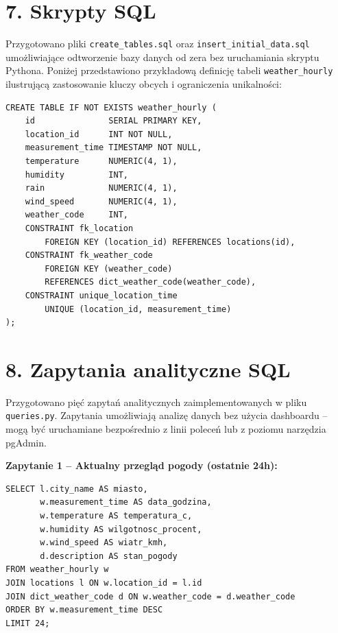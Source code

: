 \documentclass[12pt, a4paper]{article}
\begin{document}
\section*{\textbf{7. Skrypty SQL}}

Przygotowano pliki \texttt{create\_tables.sql} oraz \texttt{insert\_initial\_data.sql}
umożliwiające odtworzenie bazy danych od zera bez uruchamiania skryptu Pythona.
Poniżej przedstawiono przykładową definicję tabeli \texttt{weather\_hourly}
ilustrującą zastosowanie kluczy obcych i ograniczenia unikalności:

\begin{lstlisting}
CREATE TABLE IF NOT EXISTS weather_hourly (
    id               SERIAL PRIMARY KEY,
    location_id      INT NOT NULL,
    measurement_time TIMESTAMP NOT NULL,
    temperature      NUMERIC(4, 1),
    humidity         INT,
    rain             NUMERIC(4, 1),
    wind_speed       NUMERIC(4, 1),
    weather_code     INT,
    CONSTRAINT fk_location
        FOREIGN KEY (location_id) REFERENCES locations(id),
    CONSTRAINT fk_weather_code
        FOREIGN KEY (weather_code)
        REFERENCES dict_weather_code(weather_code),
    CONSTRAINT unique_location_time
        UNIQUE (location_id, measurement_time)
);
\end{lstlisting}


\section*{\textbf{8. Zapytania analityczne SQL}}

Przygotowano pięć zapytań analitycznych zaimplementowanych w pliku \texttt{queries.py}.
Zapytania umożliwiają analizę danych bez użycia dashboardu -- mogą być
uruchamiane bezpośrednio z linii poleceń lub z poziomu narzędzia pgAdmin.

\textbf{Zapytanie 1 -- Aktualny przegląd pogody (ostatnie 24h):}
\begin{lstlisting}
SELECT l.city_name AS miasto,
       w.measurement_time AS data_godzina,
       w.temperature AS temperatura_c,
       w.humidity AS wilgotnosc_procent,
       w.wind_speed AS wiatr_kmh,
       d.description AS stan_pogody
FROM weather_hourly w
JOIN locations l ON w.location_id = l.id
JOIN dict_weather_code d ON w.weather_code = d.weather_code
ORDER BY w.measurement_time DESC
LIMIT 24;
\end{lstlisting}
\end{document}
